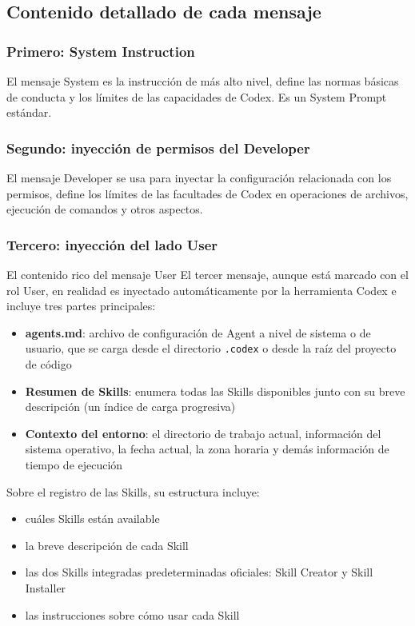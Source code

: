 \documentclass[a4paper]{article}
\begin{document}
\subsection{Contenido detallado de cada mensaje}

\subsubsection{Primero: System Instruction}

El mensaje System es la instrucción de más alto nivel, define las normas básicas de conducta y los límites de las capacidades de Codex. Es un System Prompt estándar.

\subsubsection{Segundo: inyección de permisos del Developer}

El mensaje Developer se usa para inyectar la configuración relacionada con los permisos, define los límites de las facultades de Codex en operaciones de archivos, ejecución de comandos y otros aspectos.

\subsubsection{Tercero: inyección del lado User}

\begin{knowledgebox}{El contenido rico del mensaje User}
El tercer mensaje, aunque está marcado con el rol User, en realidad es inyectado automáticamente por la herramienta Codex e incluye tres partes principales:
\begin{itemize}
    \item \textbf{agents.md}: archivo de configuración de Agent a nivel de sistema o de usuario, que se carga desde el directorio \texttt{.codex} o desde la raíz del proyecto de código
    \item \textbf{Resumen de Skills}: enumera todas las Skills disponibles junto con su breve descripción (un índice de carga progresiva)
    \item \textbf{Contexto del entorno}: el directorio de trabajo actual, información del sistema operativo, la fecha actual, la zona horaria y demás información de tiempo de ejecución
\end{itemize}
\end{knowledgebox}

Sobre el registro de las Skills, su estructura incluye:
\begin{itemize}
    \item cuáles Skills están available
    \item la breve descripción de cada Skill
    \item las dos Skills integradas predeterminadas oficiales: Skill Creator y Skill Installer
    \item las instrucciones sobre cómo usar cada Skill
\end{itemize}
\end{document}

